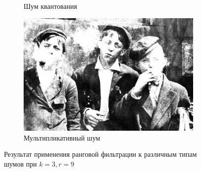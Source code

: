 \begin{figure}[ht]
\begin{subfigure}[b]{0.5\linewidth}
      \caption{Шум квантования} 
      \label{rang_3_9:e}
    \end{subfigure}%
    \begin{subfigure}[b]{0.5\linewidth}
        \centering
        \includegraphics[width=0.95\linewidth]{../Rang_Filter/Rang_Speckle_noise_(k=3,r=9).jpg} 
        \caption{Мультипликативный шум} 
        \label{rang_3_9:f} 
    \end{subfigure} 
    \caption{Результат применения ранговой фильтрации к различным типам шумов при $k = 3, r = 9$}
    \label{img:rang_3_9} 
\end{figure}




